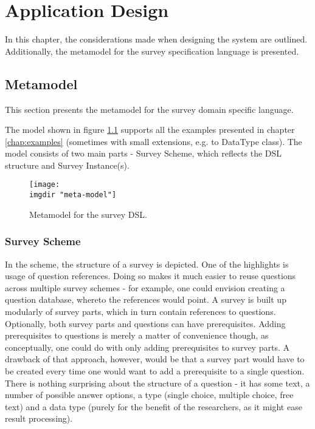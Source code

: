 \chapter{Application Design}
\label{chap:design}
In this chapter, the considerations made when designing the system are outlined. Additionally, the metamodel for the survey specification language is presented.

\section{Metamodel}
\label{sec:metamodel}
This section presents the metamodel for the survey domain specific language.  

The model shown in figure \ref{fig:metamodel} supports all the examples presented in chapter \ref{chap:examples} (sometimes with small extensions, e.g. to DataType class).
The model consists of two main parts - Survey Scheme, which reflects the DSL structure and Survey Instance(s).

\begin{figure}[!ht]
  \texttt{[image: \\imgdir "meta-model"]}
  \caption{Metamodel for the survey DSL.}
  \label{fig:metamodel}
\end{figure}

\subsection{Survey Scheme}
\label{subsec:surveyscheme}
In the scheme, the structure of a survey is depicted. One of the highlights is usage of question references. Doing so makes it much easier to reuse questions across multiple survey schemes - for example, one could envision creating a question database, whereto the references would point.
A survey is built up modularly of survey parts, which in turn contain references to questions. Optionally, both survey parts and questions can have prerequisites. Adding prerequisites to questions is merely a matter of convenience though, as conceptually, one could do with only adding prerequisites to survey parts. A drawback of that approach, however, would be that a survey part would have to be created every time one would want to add a prerequisite to a single question.
There is nothing surprising about the structure of a question - it has some text, a number of possible answer options, a type (single choice, multiple choice, free text) and a data type (purely for the benefit of the researchers, as it might ease result processing).

